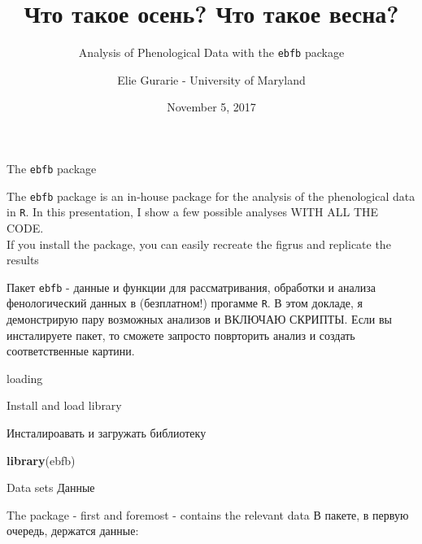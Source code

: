 \documentclass[9pt,ignorenonframetext,aspectratio=169]{beamer}
\title{Что такое осень? Что такое весна?}
\subtitle{Analysis of Phenological Data with the \texttt{ebfb} package}
\author{Elie Gurarie - University of Maryland}
\date{November 5, 2017}
\newenvironment{Shaded}{\begin{snugshade}}{\end{snugshade}}
\newcommand{\KeywordTok}[1]{\textcolor[rgb]{0.13,0.29,0.53}{\textbf{#1}}}
\newcommand{\NormalTok}[1]{#1}
\begin{document}
\frame{\titlepage}

\begin{frame}[fragile]{The \texttt{ebfb} package}
\protect\hypertarget{the-ebfb-package}{}

\bcols
{}

\bi

\I The \texttt{ebfb} package is an in-house package for the analysis of
the phenological data in \texttt{R}. \I In this presentation, I show a
few possible analyses WITH ALL THE CODE.\\
\I If you install the package, you can easily recreate the figrus and
replicate the results \ei


\bi

\I Пакет \texttt{ebfb} - данные и функции для рассматривания, обработки
и анализа фенологический данных в (безплатном!) прогамме \texttt{R}.
\I В этом докладе, я демонстрирую пару возможных анализов и ВКЛЮЧАЮ
СКРИПТЫ. \I Если вы инсталируете пакет, то сможете запросто поврторить
анализ и создать соответственные картини. \ei 

\ecols

\end{frame}

\begin{frame}[fragile]{loading}
\protect\hypertarget{loading}{}

\bcols
{}

Install and load library 

Инсталироавать и загружать библиотеку

\ecols

\begin{Shaded}
\begin{Highlighting}[]
\KeywordTok{library}\NormalTok{(ebfb)}
\end{Highlighting}
\end{Shaded}

\end{frame}

\begin{frame}{Data sets \textbar{} Данные}
\protect\hypertarget{data-sets-}{}

\bcols
{}

The package - first and foremost - contains the relevant data  В
пакете, в первую очередь, держатся данные: \ecols

\small

\end{frame}
\end{document}
